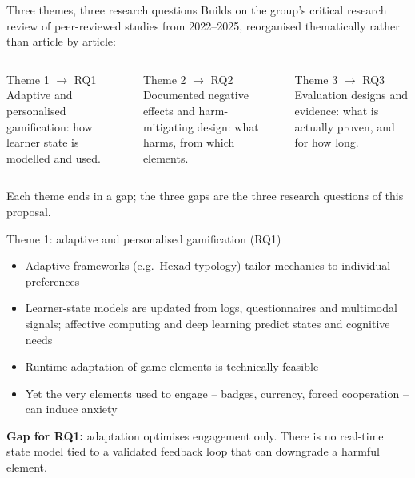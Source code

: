 \documentclass[10pt]{beamer}
\begin{document}
\begin{frame}{Three themes, three research questions}
Builds on the group's critical research review of peer-reviewed studies from 2022--2025,
reorganised thematically rather than article by article:
\vspace{0.2cm}
\begin{columns}[T]
    \begin{block}{Theme 1 $\rightarrow$ RQ1}
        Adaptive and personalised gamification: how learner state is modelled and used.
    \end{block}
    \begin{block}{Theme 2 $\rightarrow$ RQ2}
        Documented negative effects and harm-mitigating design: what harms, from which elements.
    \end{block}
    \begin{block}{Theme 3 $\rightarrow$ RQ3}
        Evaluation designs and evidence: what is actually proven, and for how long.
    \end{block}
\end{columns}
\vspace{0.3cm}
\begin{keybox}
Each theme ends in a gap; the three gaps are the three research questions of this proposal.
\end{keybox}
\end{frame}

\begin{frame}{Theme 1: adaptive and personalised gamification (RQ1)}
\begin{itemize}
    \item Adaptive frameworks (e.g.\ Hexad typology) tailor mechanics to individual preferences
    \cite{zourmpakis2023adaptive,vistorte2024integrating}
    \item Learner-state models are updated from logs, questionnaires and multimodal signals;
    affective computing and deep learning predict states and cognitive needs
    \cite{vistorte2024integrating,naseer2025game}
    \item Runtime adaptation of game elements is technically feasible
    \cite{zourmpakis2023adaptive,shabadurai2025reinforcement}
    \item Yet the very elements used to engage -- badges, currency, forced cooperation -- can
    induce anxiety \cite{zourmpakis2023adaptive}
\end{itemize}
\vspace{0.1cm}
\begin{keybox}
\textbf{Gap for RQ1:} adaptation optimises engagement only. There is no real-time state model
tied to a validated feedback loop that can downgrade a harmful element. \cite{farhan2023machine}
\end{keybox}
\end{frame}
\end{document}
